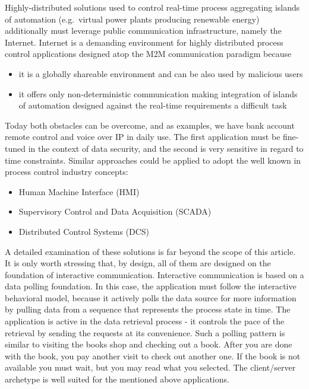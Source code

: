 \documentclass{article}
\begin{document}
Highly-distributed solutions used to control real-time process aggregating islands of automation (e.g.~virtual power plants producing renewable energy) additionally must leverage public communication infrastructure, namely the Internet. Internet is a demanding environment for highly distributed process control applications designed atop the M2M communication paradigm because

\begin{itemize}
      \item it is a globally shareable environment and can be also used by malicious users
      \item it offers only non-deterministic communication making integration of islands of automation designed against the real-time requirements a difficult task
\end{itemize}

Today both obstacles can be overcome, and as examples, we have bank account remote control and voice over IP in daily use. The first application must be fine-tuned in the context of data security, and the second is very sensitive in regard to time constraints. Similar approaches could be applied to adopt the well known in process control industry concepts:

\begin{itemize}
      \item  Human Machine Interface (HMI)
      \item Supervisory Control and Data Acquisition (SCADA)
      \item Distributed Control Systems (DCS)
\end{itemize}

A detailed examination of these solutions is far beyond the scope of this article. It is only worth stressing that, by design, all of them are designed on the foundation of interactive communication. Interactive communication is based on a data polling foundation. In this case, the application must follow the interactive behavioral model, because it actively polls the data source for more information by pulling data from a sequence that represents the process state in time. The application is active in the data retrieval process - it controls the pace of the retrieval by sending the requests at its convenience. Such a polling pattern is similar to visiting the books shop and checking out a book. After you are done with the book, you pay another visit to check out another one. If the book is not available you must wait, but you may read what you selected. The client/server archetype is well suited for the mentioned above applications.
\end{document}
